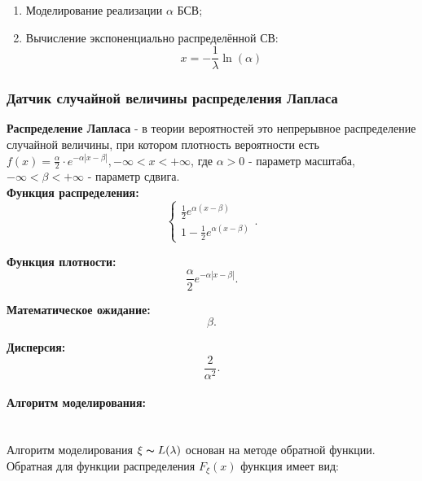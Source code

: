 \begin{enumerate}
	\item Моделирование реализации $\alpha$ БСВ;
	\item Вычисление экспоненциально распределённой СВ:
	      \begin{equation}
		      x = -\frac{1}{\lambda}\ln(\alpha)
	      \end{equation}
\end{enumerate}

\subsubsection{Датчик случайной величины распределения Лапласа}

\textbf{Распределение Лапласа} - в теории вероятностей это непрерывное распределение случайной величины, при котором плотность вероятности есть $f(x)=\frac{\alpha}{2} \cdot e^{-\alpha|x-\beta|}, -\infty < x < +\infty$, где $\alpha > 0$ - параметр масштаба, $-\infty < \beta < +\infty$ - параметр сдвига.\\

\textbf{Функция распределения:}
\begin{equation}
	\begin{cases}{}
		\frac{1}{2}e^{\alpha(x-\beta)} \\
		1-\frac{1}{2}e^{\alpha(x-\beta)}
	\end{cases}.
\end{equation}

\textbf{Функция плотности:}
\begin{equation}
	\frac{\alpha}{2}e^{-\alpha|x-\beta|}.
\end{equation}

\textbf{Математическое ожидание:}
\begin{equation}
	\beta.
\end{equation}

\textbf{Дисперсия:}
\begin{equation}
	\frac{2}{\alpha^{2}}.
\end{equation}

\paragraph{Алгоритм моделирования:}\
\\

Алгоритм моделирования $\xi \thicksim L(\lambda)$ основан на методе обратной функции. Обратная для функции распределения $F_{\xi}(x)$ функция имеет вид:

